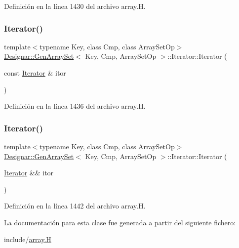 Definición en la línea 1430 del archivo array.\+H.

\mbox{\label{class_designar_1_1_gen_array_set_1_1_iterator_a080025e4989fd5c3110e93e0c7c17fe2}} 
\subsubsection{\texorpdfstring{Iterator()}{Iterator()}\hspace{0.1cm}{\footnotesize\ttfamily [4/5]}}
{\footnotesize\ttfamily template$<$typename Key, class Cmp, class Array\+Set\+Op$>$ \\
\hyperlink{class_designar_1_1_gen_array_set}{Designar\+::\+Gen\+Array\+Set}$<$ Key, Cmp, Array\+Set\+Op $>$\+::Iterator\+::\+Iterator (\begin{DoxyParamCaption}\item[{const \hyperlink{class_designar_1_1_gen_array_set_1_1_iterator}{Iterator} \&}]{itor }\end{DoxyParamCaption})\hspace{0.3cm}{\ttfamily [inline]}}



Definición en la línea 1436 del archivo array.\+H.

\mbox{\label{class_designar_1_1_gen_array_set_1_1_iterator_aa82e1690f18b28782163e6bbb9d7d32a}} 
\subsubsection{\texorpdfstring{Iterator()}{Iterator()}\hspace{0.1cm}{\footnotesize\ttfamily [5/5]}}
{\footnotesize\ttfamily template$<$typename Key, class Cmp, class Array\+Set\+Op$>$ \\
\hyperlink{class_designar_1_1_gen_array_set}{Designar\+::\+Gen\+Array\+Set}$<$ Key, Cmp, Array\+Set\+Op $>$\+::Iterator\+::\+Iterator (\begin{DoxyParamCaption}\item[{\hyperlink{class_designar_1_1_gen_array_set_1_1_iterator}{Iterator} \&\&}]{itor }\end{DoxyParamCaption})\hspace{0.3cm}{\ttfamily [inline]}}



Definición en la línea 1442 del archivo array.\+H.



La documentación para esta clase fue generada a partir del siguiente fichero\+:\begin{DoxyCompactItemize}
\item 
include/\hyperlink{array_8_h}{array.\+H}\end{DoxyCompactItemize}
